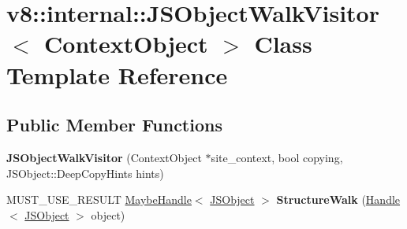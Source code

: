 \hypertarget{classv8_1_1internal_1_1_j_s_object_walk_visitor}{}\section{v8\+:\+:internal\+:\+:J\+S\+Object\+Walk\+Visitor$<$ Context\+Object $>$ Class Template Reference}
\label{classv8_1_1internal_1_1_j_s_object_walk_visitor}
\subsection*{Public Member Functions}
\begin{DoxyCompactItemize}
\item 
\hypertarget{classv8_1_1internal_1_1_j_s_object_walk_visitor_a6f4be6139eeced908e1cc941f370d7a9}{}{\bfseries J\+S\+Object\+Walk\+Visitor} (Context\+Object $\ast$site\+\_\+context, bool copying, J\+S\+Object\+::\+Deep\+Copy\+Hints hints)\label{classv8_1_1internal_1_1_j_s_object_walk_visitor_a6f4be6139eeced908e1cc941f370d7a9}

\item 
\hypertarget{classv8_1_1internal_1_1_j_s_object_walk_visitor_a2f0d22c56f043331aae7fcb88e175ee6}{}M\+U\+S\+T\+\_\+\+U\+S\+E\+\_\+\+R\+E\+S\+U\+L\+T \hyperlink{classv8_1_1internal_1_1_maybe_handle}{Maybe\+Handle}$<$ \hyperlink{classv8_1_1internal_1_1_j_s_object}{J\+S\+Object} $>$ {\bfseries Structure\+Walk} (\hyperlink{classv8_1_1internal_1_1_handle}{Handle}$<$ \hyperlink{classv8_1_1internal_1_1_j_s_object}{J\+S\+Object} $>$ object)\label{classv8_1_1internal_1_1_j_s_object_walk_visitor_a2f0d22c56f043331aae7fcb88e175ee6}

\end{DoxyCompactItemize}
